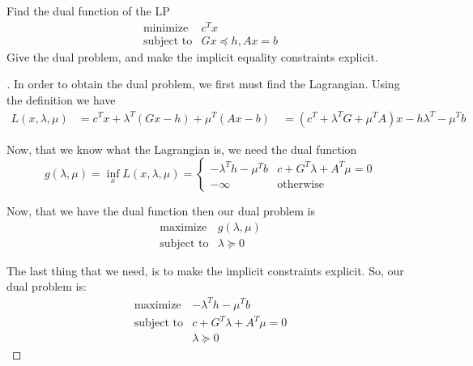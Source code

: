 \begin{prob}[4.3]
  Find the dual function of the LP
      \begin{eqnarray*}
      \mbox{minimize} & c^{T} x\\
      \mbox{subject to} & Gx \preccurlyeq h, Ax = b
      \end{eqnarray*}
      Give the dual problem, and make the implicit equality constraints explicit.
    \begin{proof}[\sol]
      In order to obtain the dual problem, we first must find the Lagrangian.
      Using the definition we have
      \begin{eqnarray*}
        L(x,\lambda,\mu) & =  c^{T}x + \lambda^{T}(Gx - h) + \mu^{T}(Ax - b)\
        & =  (c^{T} + \lambda^{T}G + \mu^{T}A)x - h\lambda^{T} - \mu^{T}b
      \end{eqnarray*}

      Now, that we know what the Lagrangian is, we need the dual function
      \[
      g(\lambda,\mu) = \inf_{x} L(x,\lambda,\mu) =
      \begin{cases}
          -\lambda^{T} h -\mu^{T}b & c + G^{T}\lambda + A^{T}\mu = 0\\
          -\infty & \mbox{otherwise}
      \end{cases}
      \]

      Now, that we have the dual function then our dual problem is
      \begin{eqnarray*}
        \mbox{maximize} & g(\lambda, \mu)\\
        \mbox{subject to} & \lambda \succcurlyeq 0
      \end{eqnarray*}

      The last thing that we need, is to make the implicit constraints explicit.
      So, our dual problem is:
      \begin{eqnarray*}
        \mbox{maximize} & -\lambda^{T}h - \mu^{T}b\\
        \mbox{subject to} & c + G^{T} \lambda + A^{T}\mu = 0\\
        & \lambda \succcurlyeq 0
        \end{eqnarray*}
    \end{proof} 
\end{prob}
